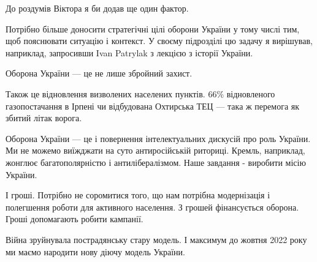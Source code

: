 До роздумів Віктора я би  додав ще один фактор. 

Потрібно більше доносити стратегічні цілі оборони України у тому числі тим, щоб
пояснювати ситуацію і контекст. У своєму підрозділі цю задачу я вирішував,
наприклад, запросивши Ivan Patrylak з лекцією з історії України. 

Оборона України — це не лише збройний захист. 

Також це відновлення визволених населених пунктів. 66\% відновленого
газопостачання в Ірпені чи відбудована Охтирська ТЕЦ — така ж перемога як
збитий літак ворога.

Оборона України — це і повернення інтелектуальних дискусій про роль України. Ми
не можемо виїжджати на суто антиросійській риториці. Кремль, наприклад,
жонглює багатополярністю і антилібералізмом. Наше завдання - виробити місію
України.

І гроші. Потрібно не соромитися того, що нам потрібна модернізація і полегшення
роботи для активного населення. З грошей фінансується оборона. Гроші
допомагають робити кампанії.

Війна зруйнувала пострадянську стару модель. І максимум до жовтня 2022 року ми
маємо народити нову діючу модель України.

